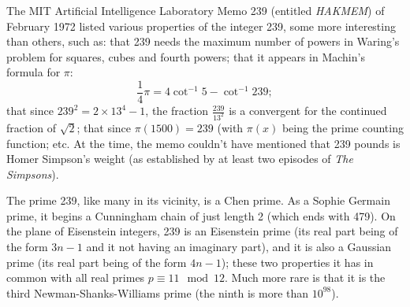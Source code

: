 \documentclass[12pt]{article}
\begin{document}
The MIT Artificial Intelligence Laboratory Memo 239 (entitled {\it HAKMEM}) of February 1972 listed various properties of the integer 239, some more interesting than others, such as: that 239 needs the maximum number of powers in Waring's problem for squares, cubes and fourth powers; that it appears in Machin's formula for $\pi$: $$\frac{1}{4}\pi = 4\cot^{-1}5 - \cot^{-1}239;$$ that since $239^2 = 2 \times 13^4 - 1$, the fraction $\frac{239}{13^2}$ is a convergent for the continued fraction of $\sqrt{2}$; that since $\pi(1500) = 239$ (with $\pi(x)$ being the prime counting function; etc. At the time, the memo couldn't have mentioned that 239 pounds is Homer Simpson's weight (as established by at least two episodes of {\it The Simpsons}).

The prime 239, like many in its vicinity, is a Chen prime. As a Sophie Germain prime, it begins a Cunningham chain of just length 2 (which ends with 479). On the plane of Eisenstein integers, 239 is an Eisenstein prime (its real part being of the form $3n - 1$ and it not having an imaginary part), and it is also a Gaussian prime (its real part being of the form $4n - 1$); these two properties it has in common with all real primes $p \equiv 11 \mod 12$. Much more rare is that it is the third Newman-Shanks-Williams prime (the ninth is more than $10^{98}$).
\end{document}
